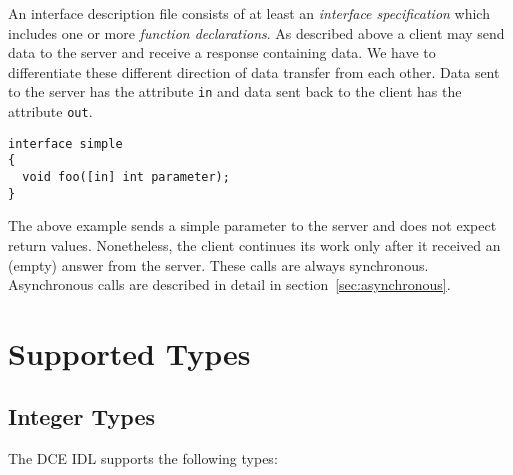 An interface description file consists of at least an {\em interface
specification} which includes one or more {\em function declarations}.  As
described above a client may send data to the server and receive a response
containing data. We have to differentiate these different direction of data
transfer from each other. Data sent to the server has the attribute \verb|in|
and data sent back to the client has the attribute \verb|out|.

\begin{verbatim}
interface simple
{
  void foo([in] int parameter);
}
\end{verbatim}

The above example sends a simple parameter to the server and does not expect
return values. Nonetheless, the client continues its work only after it
received an (empty) answer from the server. These calls are always
synchronous.  Asynchronous calls are described in detail in
section~\ref{sec:asynchronous}.

\section{Supported Types}

\subsection{Integer Types}
The DCE IDL supports the following types:

